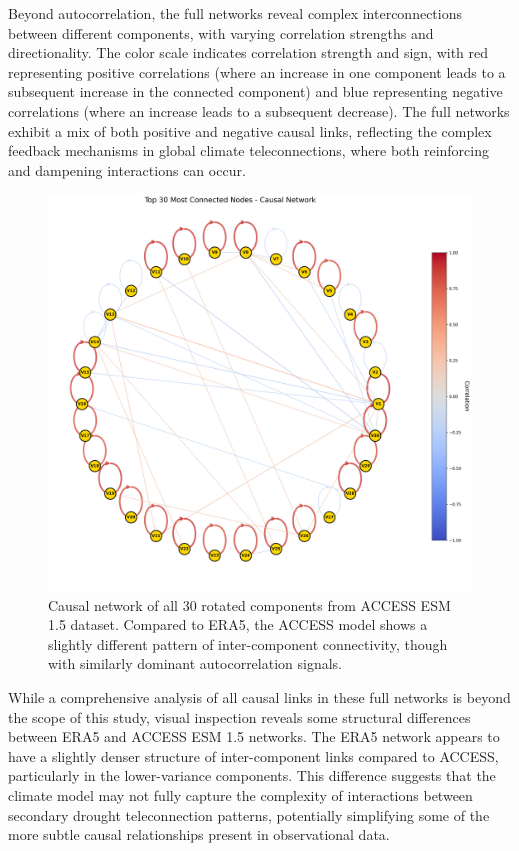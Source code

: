 \documentclass[
]{krantz}
\begin{document}
Beyond autocorrelation, the full networks reveal complex interconnections between different components, with varying correlation strengths and directionality. The color scale indicates correlation strength and sign, with red representing positive correlations (where an increase in one component leads to a subsequent increase in the connected component) and blue representing negative correlations (where an increase leads to a subsequent decrease). The full networks exhibit a mix of both positive and negative causal links, reflecting the complex feedback mechanisms in global climate teleconnections, where both reinforcing and dampening interactions can occur.

\begin{figure}

{\centering \includegraphics[width=0.49\linewidth]{work/02-causaldisc/figures/ACCESS/enhanced_causal_network} 

}

\caption{Causal network of all 30 rotated components from ACCESS ESM 1.5 dataset. Compared to ERA5, the ACCESS model shows a slightly different pattern of inter-component connectivity, though with similarly dominant autocorrelation signals.}\label{fig:figure6}
\end{figure}

While a comprehensive analysis of all causal links in these full networks is beyond the scope of this study, visual inspection reveals some structural differences between ERA5 and ACCESS ESM 1.5 networks. The ERA5 network appears to have a slightly denser structure of inter-component links compared to ACCESS, particularly in the lower-variance components. This difference suggests that the climate model may not fully capture the complexity of interactions between secondary drought teleconnection patterns, potentially simplifying some of the more subtle causal relationships present in observational data.
\end{document}
